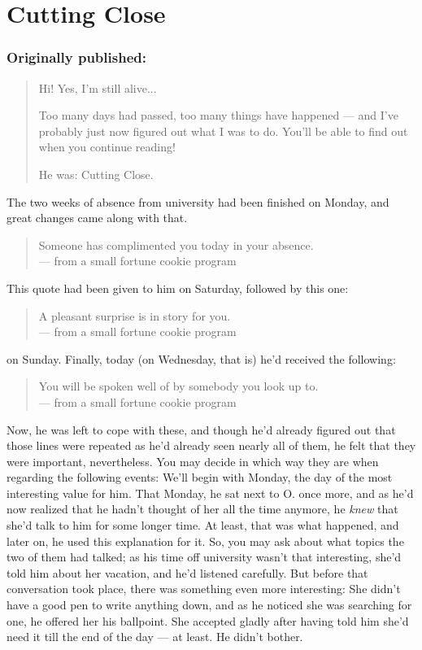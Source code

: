 \chapter{Cutting Close}
\label{cha:cutting-close}
\subsection*{Originally published: }
\begin{quote}
Hi! Yes, I'm still alive...

Too many days had passed, too many things have happened --- and I've probably just now figured out what I was to do. You'll be able to find out when you continue reading!

He was: Cutting Close.
\end{quote}

The two weeks of absence from university had been finished on Monday, and great changes came along with that. 
\begin{quote}
Someone has complimented you today in your absence. \\
--- from a small fortune cookie program
\end{quote}
This quote had been given to him on Saturday, followed by this one: 
\begin{quote}
A pleasant surprise is in story for you. \\
--- from a small fortune cookie program
\end{quote}
on Sunday. Finally, today (on Wednesday, that is) he'd received the following: 
\begin{quote}
You will be spoken well of by somebody you look up to. \\
--- from a small fortune cookie program
\end{quote}
Now, he was left to cope with these, and though he'd already figured out that those lines were repeated as he'd already seen nearly all of them, he felt that they were important, nevertheless. You may decide in which way they are when regarding the following events: 
We'll begin with Monday, the day of the most interesting value for him. That Monday, he sat next to O. once more, and as he'd now realized that he hadn't thought of her all the time anymore, he \emph{knew} that she'd talk to him for some longer time. At least, that was what happened, and later on, he used this explanation for it. So, you may ask about what topics the two of them had talked; as his time off university wasn't that interesting, she'd told him about her vacation, and he'd listened carefully. But before that conversation took place, there was something even more interesting: She didn't have a good pen to write anything down, and as he noticed she was searching for one, he offered her his ballpoint. She accepted gladly after having told him she'd need it till the end of the day --- at least. 
He didn't bother.

